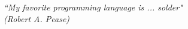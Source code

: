 \begin{epigrafe}
    \vspace*{\fill}
	\begin{flushright}
		\textit{``My favorite programming language is ... solder" \\
        (Robert A. Pease)}
	\end{flushright}
\end{epigrafe}